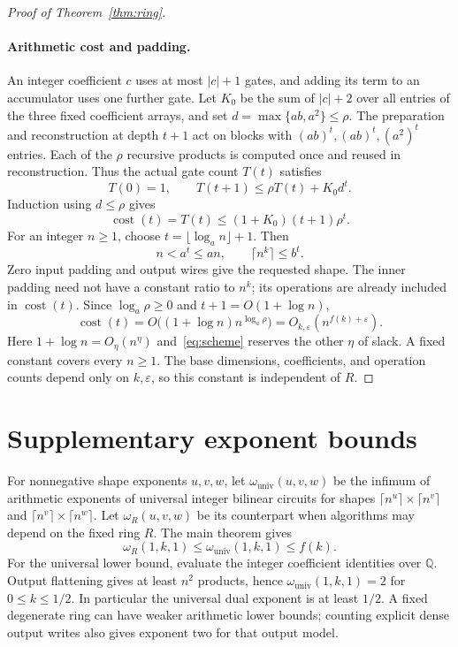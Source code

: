 \documentclass[11pt]{article}
\theoremstyle{remark}
\newcommand{\Q}{\mathbb Q}
\begin{document}
\begin{proof}[Proof of Theorem~\ref{thm:ring}]
\paragraph{Arithmetic cost and padding.}
An integer coefficient $c$ uses at most $|c|+1$ gates, and adding
its term to an accumulator uses one further gate. Let $K_0$ be the
sum of $|c|+2$ over all entries of the three fixed coefficient arrays,
and set $d=\max\{ab,a^2\}\leq\rho$. The preparation and reconstruction
at depth $t+1$ act on blocks with $(ab)^t,(ab)^t,(a^2)^t$ entries.
Each of the $\rho$ recursive products is computed once and reused in
reconstruction. Thus the actual gate count $T(t)$ satisfies
\[
 T(0)=1,\qquad T(t+1)\leq\rho T(t)+K_0d^t.
\]
Induction using $d\leq\rho$ gives
\[
 \operatorname{cost}(t)=T(t)\leq(1+K_0)(t+1)\rho^t.
\]
For an integer $n\geq1$, choose $t=\lfloor\log_a n\rfloor+1$.
Then
\[
 n<a^t\leq an,\qquad \lceil n^k\rceil\leq b^t.
\]
Zero input padding and output wires give the requested shape.
The inner padding need not have a constant ratio to $n^k$; its
operations are already included in $\operatorname{cost}(t)$.
Since $\log_a\rho\geq0$ and $t+1=O(1+\log n)$,
\[
 \operatorname{cost}(t)=O\bigl((1+\log n)n^{\log_a\rho}\bigr)
                     =O_{k,\varepsilon}(n^{f(k)+\varepsilon}).
\]
Here $1+\log n=O_\eta(n^\eta)$ and~\eqref{eq:scheme} reserves the
other $\eta$ of slack. A fixed constant covers every $n\geq1$.
The base dimensions, coefficients, and operation counts depend only
on $k,\varepsilon$, so this constant is independent of $R$.
\end{proof}

\section{Supplementary exponent bounds}

For nonnegative shape exponents $u,v,w$, let
$\omega_{\mathrm{univ}}(u,v,w)$ be the infimum of arithmetic exponents
of universal integer bilinear circuits for shapes
$\lceil n^u\rceil\times\lceil n^v\rceil$ and
$\lceil n^v\rceil\times\lceil n^w\rceil$. Let $\omega_R(u,v,w)$ be
its counterpart when algorithms may depend on the fixed ring $R$.
The main theorem gives
\[
 \omega_R(1,k,1)\leq\omega_{\mathrm{univ}}(1,k,1)\leq f(k).
\]
For the universal lower bound, evaluate the integer coefficient
identities over $\Q$. Output flattening gives at least $n^2$
products, hence
$\omega_{\mathrm{univ}}(1,k,1)=2$ for $0\leq k\leq1/2$.
In particular the universal dual exponent is at least $1/2$.
A fixed degenerate ring can have weaker arithmetic lower bounds;
counting explicit dense output writes also gives exponent two for
that output model.
\end{document}
